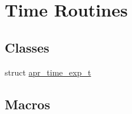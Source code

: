 \hypertarget{group__apr__time}{}\section{Time Routines}
\label{group__apr__time}
\subsection*{Classes}
\begin{DoxyCompactItemize}
\item 
struct \mbox{\hyperlink{structapr__time__exp__t}{apr\+\_\+time\+\_\+exp\+\_\+t}}
\end{DoxyCompactItemize}
\subsection*{Macros}
